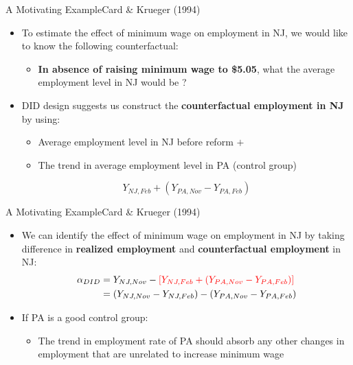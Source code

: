 \documentclass[dvipsnames,hyperref={pdfpagelabels=false}]{beamer}
\begin{document}
\begin{frame}{A Motivating Example}{Card \& Krueger (1994)}



\begin{itemize}
\item To estimate the effect of minimum wage on employment in NJ, we would like to know the following counterfactual:
\vspace{0.2cm}
\begin{itemize}
\item \textbf{In absence of raising minimum wage to \$5.05}, what the average employment level in NJ would be ?
\end{itemize}
\vspace{0.2cm}
\item DID design suggests us construct the \textbf{counterfactual employment in NJ} by using: 
\begin{itemize}
\item Average employment level in NJ before reform $+$
\vspace{0.2cm}
\item The trend in average employment level in PA (control group)
\end{itemize}
\vspace{0.2cm}
\begin{equation*}
Y_{NJ,Feb} + (Y_{PA,Nov} - Y_{PA,Feb})
\end{equation*}

\end{itemize}
\end{frame}




\begin{frame}{A Motivating Example}{Card \& Krueger (1994)}
\begin{itemize}
\item We can identify the effect of minimum wage on employment in NJ by taking difference in \textbf{realized employment} and \textbf{counterfactual employment} in NJ:
\begin{align*}
\alpha_{DID} &=  Y_{NJ,Nov} - {\color{red}[Y_{NJ,Feb} + (Y_{PA,Nov} - Y_{PA,Feb})]}  \\
&= (Y_{NJ,Nov} - Y_{NJ,Feb}) - (Y_{PA,Nov} - Y_{PA,Feb})
\end{align*}

\item If PA is a good control group:	
\vspace{0.2cm}
\begin{itemize}
\item The trend in employment rate of PA should absorb any other changes in employment that are unrelated to increase minimum wage	
\end{itemize}
\end{itemize}

\end{frame}
\end{document}
